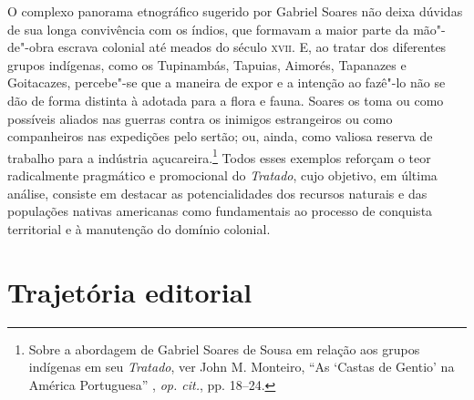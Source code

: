 O complexo panorama etnográfico sugerido por Gabriel Soares não deixa
dúvidas de sua longa convivência com os índios, que formavam a maior
parte da mão"-de"-obra escrava colonial até meados do século \textsc{xvii}. E, ao
tratar dos diferentes grupos indígenas, como os Tupinambás, Tapuias,
Aimorés, Tapanazes e Goitacazes, percebe"-se que a maneira de expor e a
intenção ao fazê"-lo não se dão de forma distinta à adotada para a flora
e fauna.  Soares os toma ou como possíveis aliados nas guerras contra
os inimigos estrangeiros ou como companheiros nas expedições pelo
sertão; ou, ainda, como valiosa reserva de trabalho para a indústria
açucareira.\footnote{ Sobre a abordagem de Gabriel Soares de Sousa em
relação aos grupos indígenas em seu \textit{Tratado}, ver John M.
Monteiro, ``As ‘Castas de Gentio’ na América Portuguesa'' ,
\textit{op. cit.}, pp. 18--24.} Todos esses exemplos reforçam o teor
radicalmente pragmático e promocional do \textit{Tratado}, cujo
objetivo, em última análise, consiste em destacar as potencialidades
dos recursos naturais e das populações nativas americanas como
fundamentais ao processo de conquista territorial e à manutenção do domínio colonial.

\section*{Trajetória editorial}


